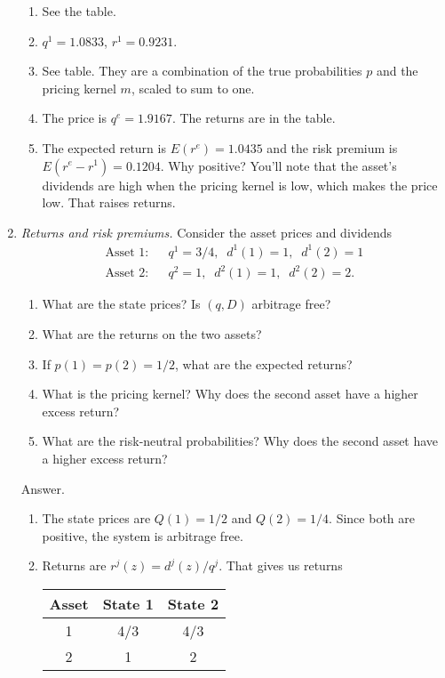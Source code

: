 \documentclass[11pt]{article}
\begin{document}
\begin{enumerate}
\begin{enumerate}
\item See the table.
\item $q^1 = 1.0833$, $r^1 = 0.9231$.
\item See table.  They are a combination of the true probabilities $p$
and the pricing kernel $m$, scaled to sum to one.
\item The price is $q^e = 1.9167$.  The returns are in the table.
\item The expected return is $ E(r^e) = 1.0435 $ and the risk
premium is $ E(r^e - r^1) = 0.1204$.
Why positive?  You'll note that the asset's dividends are high when the pricing kernel is low,
which makes the price low.
That raises returns.
\end{enumerate}


\item {\it Returns and risk premiums.\/}
Consider the asset prices and dividends
\begin{eqnarray*}
    \mbox{Asset 1:}&&  q^1 = 3/4, \;\; d^1(1) = 1, \;\; d^1(2) = 1 \\
    \mbox{Asset 2:}&&  q^2 = 1, \;\; d^2(1) = 1, \;\; d^2(2) = 2.
\end{eqnarray*}
\begin{enumerate}
\item What are the state prices? Is $(q,D)$ arbitrage free?
\item What are the returns on the two assets?
\item If $p(1) = p(2) = 1/2$, what are the expected returns?
\item What is the pricing kernel?
Why does the second asset have a higher excess return?
\item What are the risk-neutral probabilities?
Why does the second asset have a higher excess return?
\end{enumerate}
%
Answer.
\begin{enumerate}
\item The state prices are $Q(1) = 1/2$ and $Q(2) = 1/4$.
Since both are positive, the system is arbitrage free.
\item Returns are $r^j(z) = d^j(z)/q^j $.
That gives us returns

\begin{center}
\begin{tabular}{ccc}
\toprule
Asset &  State 1 & State 2 \\
\midrule
1     &  4/3  &   4/3  \\
2     &  1    &   2  \\
\bottomrule
\end{tabular}
\end{center}


\end{enumerate}
\end{enumerate}
\end{document}
